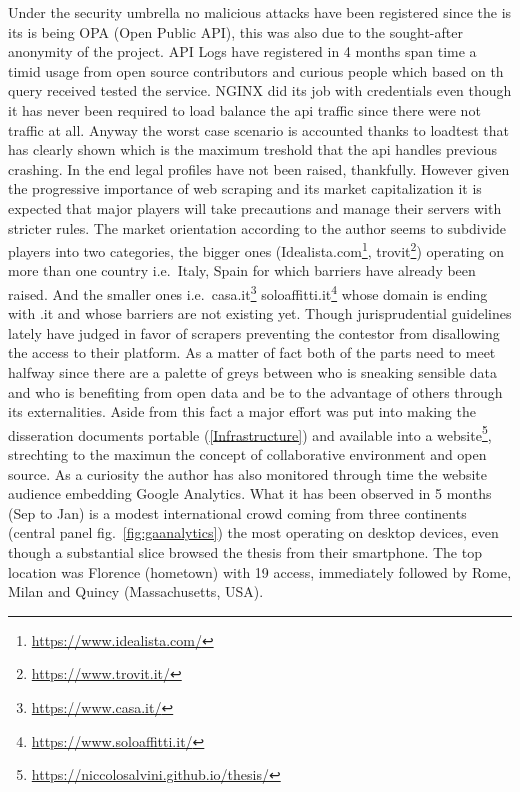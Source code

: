 \documentclass[
  12pt,
  a4paper,
  oneside]{book}
\DeclareRobustCommand{\href}[2]{#2\footnote{\url{#1}}}
\theoremstyle{definition}
\theoremstyle{definition}
\theoremstyle{definition}
\theoremstyle{remark}
\begin{document}
Under the security umbrella no malicious attacks have been registered since the is its is being OPA (Open Public API), this was also due to the sought-after anonymity of the project. API Logs have registered in 4 months span time a timid usage from open source contributors and curious people which based on th query received tested the service. NGINX did its job with credentials even though it has never been required to load balance the api traffic since there were not traffic at all. Anyway the worst case scenario is accounted thanks to loadtest that has clearly shown which is the maximum treshold that the api handles previous crashing. In the end legal profiles have not been raised, thankfully. However given the progressive importance of web scraping and its market capitalization it is expected that major players will take precautions and manage their servers with stricter rules. The market orientation according to the author seems to subdivide players into two categories, the bigger ones (\href{https://www.idealista.com/}{Idealista.com}, \href{https://www.trovit.it/}{trovit}) operating on more than one country i.e.~Italy, Spain for which barriers have already been raised. And the smaller ones i.e.~\href{https://www.casa.it/}{casa.it} \href{https://www.soloaffitti.it/}{soloaffitti.it} whose domain is ending with .it and whose barriers are not existing yet. Though jurisprudential guidelines lately have judged in favor of scrapers preventing the contestor from disallowing the access to their platform. As a matter of fact both of the parts need to meet halfway since there are a palette of greys between who is sneaking sensible data and who is benefiting from open data and be to the advantage of others through its externalities. Aside from this fact a major effort was put into making the disseration documents portable (\ref{Infrastructure}) and available into a \href{https://niccolosalvini.github.io/thesis/}{website}, strechting to the maximun the concept of collaborative environment and open source. As a curiosity the author has also monitored through time the website audience embedding Google Analytics. What it has been observed in 5 months (Sep to Jan) is a modest international crowd coming from three continents (central panel fig.~\ref{fig:gaanalytics}) the most operating on desktop devices, even though a substantial slice browsed the thesis from their smartphone. The top location was Florence (hometown) with 19 access, immediately followed by Rome, Milan and Quincy (Massachusetts, USA).
\end{document}
